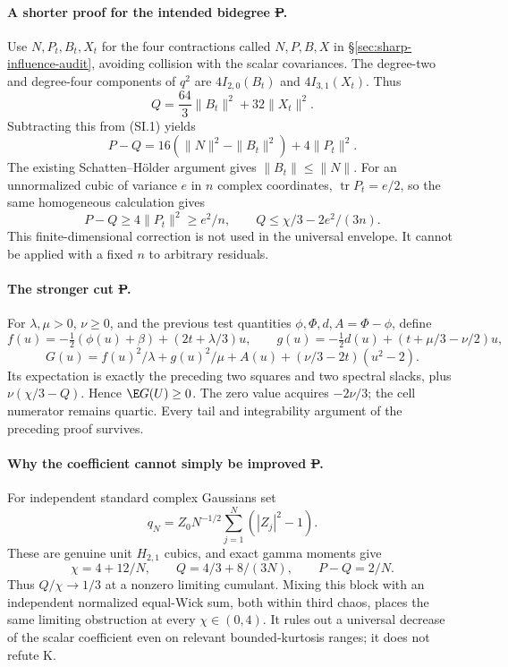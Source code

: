 \paragraph{A shorter proof for the intended bidegree \st{P}.}
Use $N,P_t,B_t,X_t$ for the four contractions called $N,P,B,X$ in
\S\ref{sec:sharp-influence-audit}, avoiding collision with the scalar
covariances. The degree-two and degree-four components of $q^2$ are
$4I_{2,0}(B_t)$ and $4I_{3,1}(X_t)$. Thus
\[
 Q=\frac{64}{3}\|B_t\|^2+32\|X_t\|^2.
\]
Subtracting this from (SI.1) yields
\begin{equation}\label{eq:bigraded-covariance-20261022}
 \boxed{P-Q=16(\|N\|^2-\|B_t\|^2)+4\|P_t\|^2.}
\end{equation}
The existing Schatten--H\"older argument gives $\|B_t\|\le\|N\|$.
For an unnormalized cubic of variance $e$ in $n$ complex coordinates,
$\operatorname{tr}P_t=e/2$, so the same homogeneous calculation gives
\[
 P-Q\ge4\|P_t\|^2\ge e^2/n,
 \qquad Q\le\chi/3-2e^2/(3n).
\]
This finite-dimensional correction is not used in the universal envelope.
It cannot be applied with a fixed $n$ to arbitrary residuals.

\paragraph{The stronger cut \st{P}.}
For $\lambda,\mu>0$, $\nu\ge0$, and the previous test quantities
$\phi,\Phi,d,A=\Phi-\phi$, define
\[
 f(u)=-\tfrac12(\phi(u)+\beta)+(2t+\lambda/3)u,\qquad
 g(u)=-\tfrac12d(u)+(t+\mu/3-\nu/2)u,
\]
\[
 G(u)=f(u)^2/\lambda+g(u)^2/\mu+A(u)+(\nu/3-2t)(u^2-2).
\]
Its expectation is exactly the preceding two squares and two spectral
slacks, plus $\nu(\chi/3-Q)$. Hence $\E G(U)\ge0$.
The zero value acquires $-2\nu/3$; the cell numerator remains quartic.
Every tail and integrability argument of the preceding proof survives.

\paragraph{Why the coefficient cannot simply be improved \st{P}.}
For independent standard complex Gaussians set
\[
 q_N=Z_0 N^{-1/2}\sum_{j=1}^N(|Z_j|^2-1).
\]
These are genuine unit $H_{2,1}$ cubics, and exact gamma moments give
\[
 \chi=4+12/N,\qquad Q=4/3+8/(3N),\qquad P-Q=2/N.
\]
Thus $Q/\chi\to1/3$ at a nonzero limiting cumulant. Mixing this block
with an independent normalized equal-Wick sum, both within third chaos,
places the same limiting obstruction at every $\chi\in(0,4)$.
It rules out a universal decrease of the scalar coefficient even on
relevant bounded-kurtosis ranges; it does not refute K.

